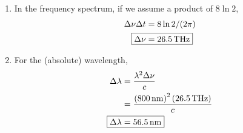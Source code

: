 \documentclass{homework}
\begin{document}
\begin{enumerate}
		\begin{enumerate}
			\item In the frequency spectrum, if we assume a product of $8 \ln 2$, \begin{align*}
				\Delta \nu \Delta t & = 8 \ln 2 / (2 \pi) \\
				\Aboxed{ \Delta \nu & = \SI{ 26.5 }{\THz} }
			\end{align*}
		
			\item For the (absolute) wavelength, \begin{align*}
				\Delta \lambda & = \frac{\lambda^2 \Delta \nu }{c} \\
					& = \frac{\left(\SI{800}{\nm}\right)^2 \left(\SI{26.5}{\THz}\right)}{c} \\
				\Aboxed{ \Delta \lambda & =  \SI{56.5}{\nm} }
			\end{align*}
		\end{enumerate}
	\end{enumerate}
\end{document}
